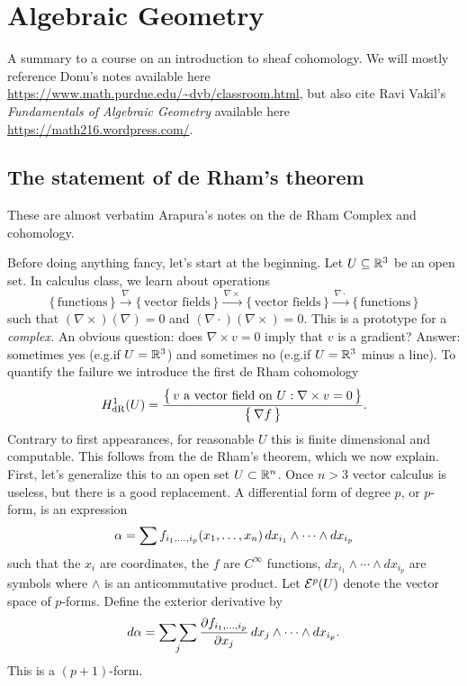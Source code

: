 \chapter{Algebraic Geometry}
A summary to a course on an introduction to sheaf cohomology. We will
mostly reference Donu's notes available here
\url{https://www.math.purdue.edu/~dvb/classroom.html}, but also cite Ravi
Vakil's \emph{Fundamentals of Algebraic Geometry} \cite{vakil} available
here \url{https://math216.wordpress.com/}.

\section{The statement of de Rham's theorem}
These are almost verbatim Arapura's notes on the de Rham Complex and
cohomology.

Before doing anything fancy, let's start at the beginning. Let
\(U\subseteq\mathbb{R}^3\) be an open set. In calculus class, we learn about
operations
\[
  \{\,\text{functions}\,\}
  \xrightarrow{\,\nabla\,}
  \{\,\text{vector fields}\,\}
  \xrightarrow{\,\nabla\times\,}
  \{\,\text{vector fields}\,\}
  \xrightarrow{\,\nabla\cdot\,}
  \{\,\text{functions}\,\}
\]
such that \((\nabla\times)(\nabla)=0\) and
\((\nabla\cdot)(\nabla\times)=0\). This is a prototype for a
\emph{complex.} An obvious question: does \(\nabla\times v=0\) imply that
\(v\) is a gradient? Answer: sometimes yes (e.g.\@ if \(U=\mathbb{R}^3\)) and
sometimes no (e.g.\@ if \(U=\mathbb{R}^3\) minus a line). To quantify the failure
we introduce the first de Rham cohomology
\[
  H_{\mathrm{dR}}^1(U)=\frac{\bigl\{\,\text{\(v\) a vector field on
      \(U\)}:\nabla\times v=0\,\bigr\}}{\bigl\{\,\nabla f\,\bigr\}}.
\]
Contrary to first appearances, for reasonable \(U\) this is finite
dimensional and computable. This follows from the de Rham's theorem, which
we now explain. First, let's generalize this to an open set
\(U\subset\mathbb{R}^n\). Once \(n>3\) vector calculus is useless, but there is a
good replacement. A differential form of degree \(p\), or \(p\)-form, is an
expression
\[
  \alpha=\sum f_{i_1,\dotsc,i_p}(x_1,\dotsc,x_n)\mathop{}\!d
  x_{i_1}\wedge\dotsb\wedge dx_{i_p}
\]
such that the \(x_i\) are coordinates, the \(f\) are \(C^\infty\)
functions, \(dx_{i_1}\wedge\dotsb\wedge dx_{i_p}\) are symbols where
\(\wedge\) is an anticommutative product. Let \(\mathcal{E}^p(U)\) denote the
vector space of \(p\)-forms. Define the exterior derivative by
\[
  d\alpha=\operatorname*{\sum\sum}_j\frac{\partial f_{i_1,\dotsc,i_p}}{\partial
    x_j}\mathop{}\!d x_j\wedge\dotsb\wedge dx_{i_p}.
\]
This is a \((p+1)\)-form.

